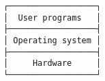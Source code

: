 \documentclass[varwidth,crop]{standalone}
\begin{document}
\begin{verbatim}
┌──────────────────┐
│  User programs   │
├──────────────────┤
│ Operating system │
├──────────────────┤
│     Hardware     │
└──────────────────┘
\end{verbatim}
\end{document}
